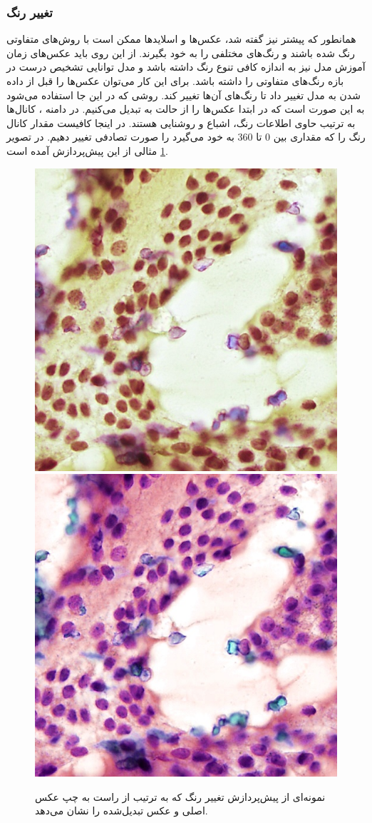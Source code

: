 \subsubsection{تغییر رنگ}
همانطور که پیشتر نیز گفته شد، عکس‌ها و اسلاید‌ها ممکن است با روش‌های متفاوتی رنگ شده باشند و رنگ‌های مختلفی را به خود بگیرند.
از این روی باید عکس‌های زمان آموزش مدل نیز به اندازه کافی تنوع رنگ داشته باشد و مدل توانایی تشخیص درست در بازه رنگ‌های متفاوتی را داشته باشد.
برای این کار می‌توان عکس‌ها را قبل از داده شدن به مدل تغییر داد تا رنگ‌های آن‌ها تغییر کند.
روشی که در این جا استفاده می‌شود به این صورت است که در ابتدا عکس‌ها را از حالت  به  تبدیل می‌کنیم.
در دامنه ، کانال‌ها به ترتیب حاوی اطلاعات رنگ، اشباع و روشنایی هستند.
در اینجا کافیست مقدار کانال رنگ را که مقداری بین 0 تا 360 به خود می‌گیرد را صورت تصادفی تغییر دهیم.
در تصویر \ref{jitter augmentation} مثالی از این پیش‌پردازش آمده است.
\begin{figure}
    \begin{center}
        \includegraphics[width=0.48\linewidth]{figs/suggested_methods/subs/data_augmentation/jitter_1054-original.jpeg}
        \includegraphics[width=0.48\linewidth]{figs/suggested_methods/subs/data_augmentation/jitter_1054-transformed.jpeg}
    \end{center}
    \caption{نمونه‌ای از پیش‌پردازش تغییر رنگ که به ترتیب از راست به چپ عکس اصلی و عکس تبدیل‌شده را نشان می‌دهد.}
    \label{jitter augmentation}
\end{figure}

